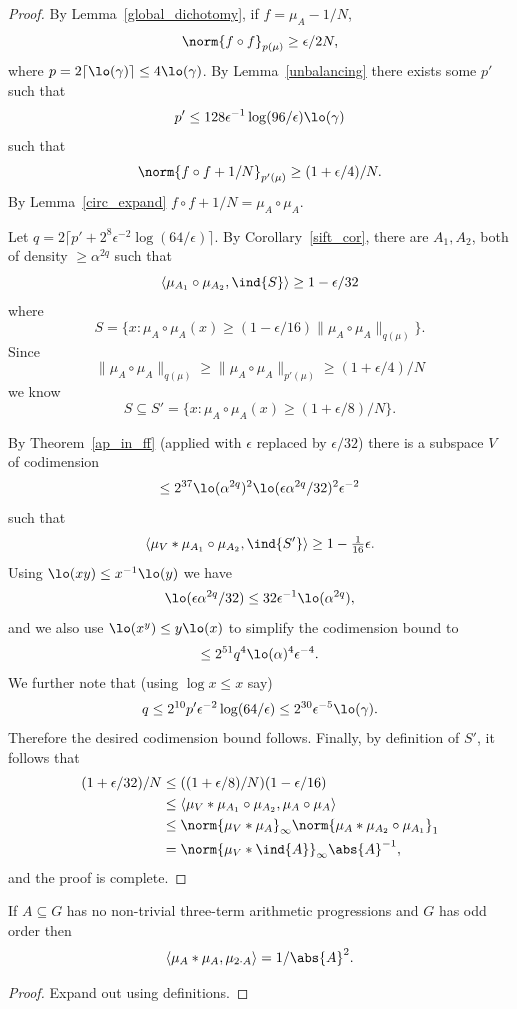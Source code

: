 \begin{proof}
\leanok

By Lemma~\ref{global_dichotomy}, if $f=\mu_A-1/N$,
\[\norm{f\circ f}_{p(\mu)}\geq \epsilon /2N,\]
where $p=2\lceil \lo(\gamma)\rceil\leq 4\lo(\gamma)$. By Lemma~\ref{unbalancing} there exists some $p'$ such that
\[p'\leq 128\epsilon^{-1}\log(96/\epsilon)\lo(\gamma)\]
such that
\[\norm{f\circ f+1/N}_{p'(\mu)}\geq (1+\epsilon/4)/N.\]
By Lemma~\ref{circ_expand} $f\circ f+1/N=\mu_A\circ \mu_A$.

Let $q=2\lceil p'+2^8\epsilon^{-2}\log(64/\epsilon)\rceil$. By Corollary~\ref{sift_cor}, there are $A_1,A_2$, both of density $\geq \alpha^{2q}$ such that
\[\langle \mu_{A_1}\circ \mu_{A_2},\ind{S}\rangle \geq 1-\epsilon/32\]
where
\[S=\{x : \mu_A\circ \mu_A(x)\geq (1-\epsilon/16)\| \mu_A\circ \mu_A\|_{q(\mu)}\}.\]
Since
\[\| \mu_A\circ \mu_A\|_{q(\mu)}\geq \| \mu_A\circ \mu_A\|_{p'(\mu)}\geq (1+\epsilon/4)/N\]
we know
\[S\subseteq S'=\{x : \mu_A\circ \mu_A(x)\geq (1+\epsilon/8)/N\}.\]

By Theorem~\ref{ap_in_ff} (applied with $\epsilon$ replaced by $\epsilon/32$) there is a subspace $V$ of codimension
\[\leq 2^{37}\lo(\alpha^{2q})^2\lo(\epsilon\alpha^{2q}/32)^2\epsilon^{-2}\] such that
\[\langle \mu_V\ast \mu_{A_1}\circ \mu_{A_2},\ind{S'}\rangle \geq 1-\tfrac{1}{16}\epsilon.\]
Using $\lo(xy)\leq x^{-1}\lo(y)$ we have
\[\lo(\epsilon \alpha^{2q}/32)\leq 32\epsilon^{-1}\lo(\alpha^{2q}),\]
and we also use $\lo(x^y)\leq y\lo(x)$ to simplify the codimension bound to
\[\leq 2^{51}q^4\lo(\alpha)^4\epsilon^{-4}.\]
We further note that (using $\log x\leq x$ say)
\[q\leq 2^{10}p'\epsilon^{-2}\log(64/\epsilon)\leq 2^{30}\epsilon^{-5}\lo(\gamma).\]
Therefore the desired codimension bound follows. Finally, by definition of $S'$, it follows that
\begin{align*}
(1+\epsilon/32)/N
&\leq ((1+\epsilon/8)/N)(1-\epsilon/16)\\
&\leq \langle \mu_V\ast \mu_{A_1}\circ \mu_{A_2},\mu_A\circ \mu_A\rangle\\
&\leq \norm{\mu_V\ast \mu_A}_\infty \norm{\mu_{A}\ast \mu_{A_2}\circ \mu_{A_1}}_1\\
&= \norm{\mu_V\ast \ind{A}}_\infty\abs{A}^{-1},
\end{align*}
and the proof is complete.
\end{proof}


\begin{lemma}
  \label{no3aps_inner_prod}
  \leanok

  If $A\subseteq G$ has no non-trivial three-term arithmetic progressions and $G$ has odd order then
  \[\langle \mu_A\ast \mu_A,\mu_{2\cdot A}\rangle = 1/\abs{A}^2.\]
\end{lemma}
\begin{proof}
  \leanok

  Expand out using definitions.
\end{proof}


